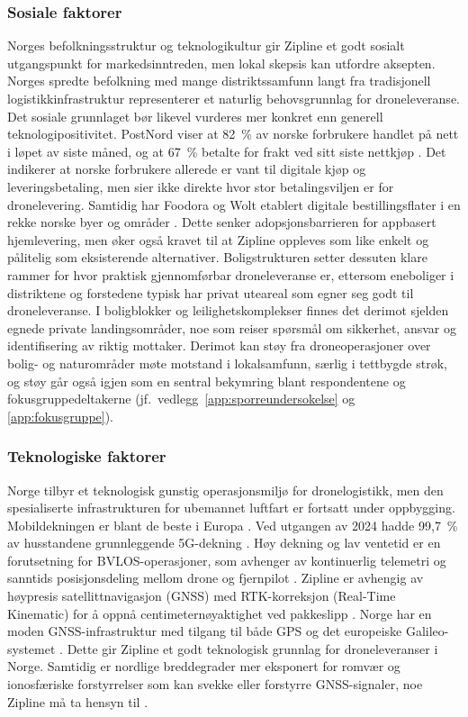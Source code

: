\subsubsection{Sosiale faktorer}
Norges befolkningsstruktur og teknologikultur gir Zipline et godt sosialt
utgangspunkt for markedsinntreden, men lokal skepsis kan utfordre aksepten.
Norges spredte befolkning med mange distriktssamfunn langt fra tradisjonell
logistikkinfrastruktur representerer et naturlig behovsgrunnlag for
droneleveranse. Det sosiale grunnlaget bør likevel vurderes mer konkret enn
generell teknologipositivitet. PostNord viser at 82~\% av norske forbrukere
handlet på nett i løpet av siste måned, og at 67~\% betalte for frakt ved sitt
siste nettkjøp \parencite{postnord2025_netthandel}. Det indikerer at norske
forbrukere allerede er vant til digitale kjøp og leveringsbetaling, men sier
ikke direkte hvor stor betalingsviljen er for dronelevering. Samtidig har
Foodora og Wolt etablert digitale bestillingsflater i en rekke norske byer og
områder \parencite{foodora2026_byer, wolt2026_asker_sandvika}. Dette senker
adopsjonsbarrieren for appbasert hjemlevering, men øker også kravet til at
Zipline oppleves som like enkelt og pålitelig som eksisterende alternativer.
Boligstrukturen setter dessuten klare rammer for hvor praktisk gjennomførbar
droneleveranse er, ettersom eneboliger i distriktene og forstedene typisk har
privat uteareal som egner seg godt til droneleveranse. I boligblokker og
leilighetskomplekser finnes det derimot sjelden egnede private
landingsområder, noe som reiser spørsmål om sikkerhet, ansvar og
identifisering av riktig mottaker. Derimot kan støy fra droneoperasjoner over
bolig- og naturområder møte motstand i lokalsamfunn, særlig i tettbygde
strøk, og støy går også igjen som en sentral bekymring blant respondentene
og fokusgruppedeltakerne (jf.\ vedlegg~\ref{app:sporreundersokelse} og
\ref{app:fokusgruppe}).

\subsubsection{Teknologiske faktorer}

Norge tilbyr et teknologisk gunstig operasjonsmiljø for dronelogistikk, men
den spesialiserte infrastrukturen for ubemannet luftfart er fortsatt under
oppbygging. Mobildekningen er blant de beste i Europa
\parencite{nkom2025_mobildekning}. Ved utgangen av 2024
hadde 99{,}7~\% av husstandene grunnleggende 5G-dekning
\parencite{nkom2024_5g}. Høy dekning og lav ventetid er en forutsetning for
BVLOS-operasjoner, som
avhenger av kontinuerlig telemetri og sanntids posisjonsdeling mellom drone
og fjernpilot \parencite{easa2016_c2_datalink}.
Zipline er avhengig av høypresis satellittnavigasjon (GNSS) med
RTK-korreksjon (Real-Time Kinematic) for å oppnå centimeternøyaktighet
ved pakkeslipp \parencite{novatel2018_zipline}. Norge har en moden
GNSS-infrastruktur med tilgang til både GPS og det europeiske
Galileo-systemet \parencite{kartverket_cpos}. 
Dette gir Zipline et godt teknologisk
grunnlag for droneleveranser i Norge. Samtidig er nordlige breddegrader mer
eksponert for romvær og ionosfæriske forstyrrelser som kan svekke
eller forstyrre GNSS-signaler, noe Zipline må ta hensyn til
\parencite{jordensmagnetfelt_romvaer}.


